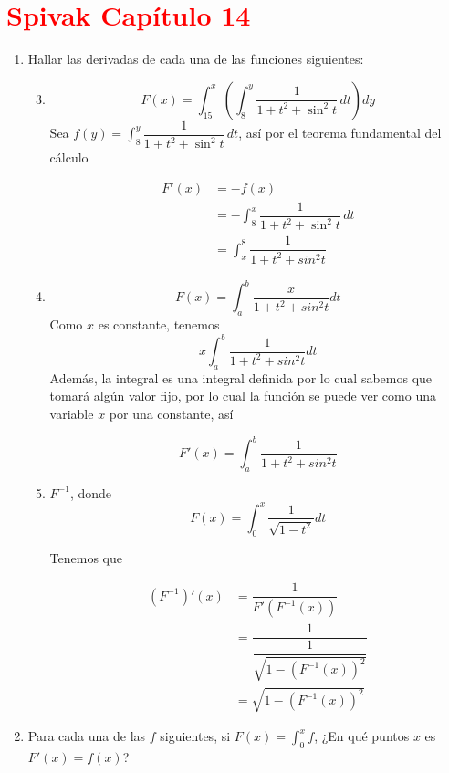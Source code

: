 \documentclass{report}
\begin{document}
    \section*{\textcolor{Red}{Spivak Capítulo 14}}
    \begin{enumerate}[label=\textcolor{Red}{\textbf{\arabic*.}}]
        \item Hallar las derivadas de cada una de las funciones siguientes:
        \begin{enumerate}[label=\textcolor{Red}{\textbf{\roman*.}}]
            \setcounter{enumii}{2}
            \item $$F(x) = \int_{15}^{x}\left(\int_{8}^{y}\dfrac{1}{1+t^2+\sin^2t}\,dt\right)dy$$
            Sea $f(y) = \int_{8}^{y}\dfrac{1}{1+t^2+\sin^2t}\,dt$, así por el teorema fundamental del cálculo

            \begin{align*}
                F'(x) &= -f(x)\\
                &= -\int_{8}^{x}\dfrac{1}{1+t^2+\sin^2t}\,dt\\
                &= \int_{x}^{8}\dfrac{1}{1+t^2+sin^2t}
            \end{align*}
            \setcounter{enumii}{4}
            \item
            $$F(x) = \int_{a}^{b}\dfrac{x}{1+t^2+sin^2t}dt$$
            Como $x$ es constante, tenemos
            $$x\int_{a}^{b}\dfrac{1}{1+t^2+sin^2t}dt$$
            Además, la integral es una integral definida por lo cual sabemos que tomará algún valor fijo, por lo cual la función se puede ver como una variable $x$ por una constante, así

            $$F'(x) = \int_{a}^{b}\dfrac{1}{1+t^2+sin^2t}$$
            \setcounter{enumii}{7}
            \item $F^{-1}$, donde $$F(x) = \int_{0}^{x}\dfrac{1}{\sqrt{1-t^2}}dt$$

            Tenemos que

            \begin{align*}
                (F^{-1})'(x) &= \dfrac{1}{F'(F^{-1}(x))}\\
                &= \dfrac{1}{\dfrac{1}{\sqrt{1-(F^{-1}(x))^2}}}\\
                &= \sqrt{1-(F^{-1}(x))^2}
            \end{align*}

        \end{enumerate}

        \item Para cada una de las $f$ siguientes, si $F(x) = \int_{0}^{x}f$, ¿En qué puntos $x$ es $F'(x) = f(x)$?


\end{enumerate}
\end{document}
